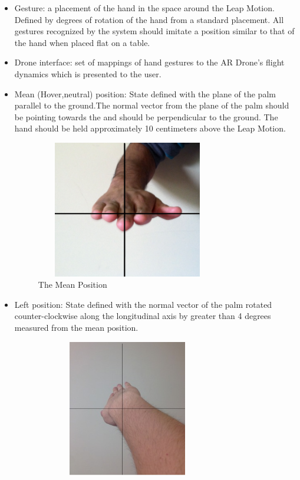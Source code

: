 \documentclass[letterpaper,english, 12pt]{article}
\begin{document}
\begin{itemize}

		\item Gesture: a placement of the hand in the space around the Leap Motion. Defined by degrees of rotation of the hand from a standard placement. All gestures recognized by the system should imitate a position similar to that of the hand when placed flat on a table. 
		\item Drone interface: set of mappings of hand gestures to the AR Drone's flight dynamics which is presented to the user. 
		\item Mean (Hover,neutral) position: State defined with the plane of the palm parallel to the ground.The normal vector from the plane of the palm should be pointing towards the and should be perpendicular to the ground. The hand should be held approximately 10 centimeters above the Leap Motion. 
		\begin{figure}[t]
			\centering
			\includegraphics[height=6cm, width=80mm]{pics/mean.jpg} 
			\caption{The Mean Position}
		\end{figure}
		\item Left position: State defined with the normal vector of the palm rotated counter-clockwise along the longitudinal axis by greater than 4 degrees measured from the mean position. 
		\begin{figure}[t]
			\centering
			\includegraphics[height=6cm, width=80mm]{pics/left.jpg} 

\end{figure}
\end{itemize}
\end{document}

